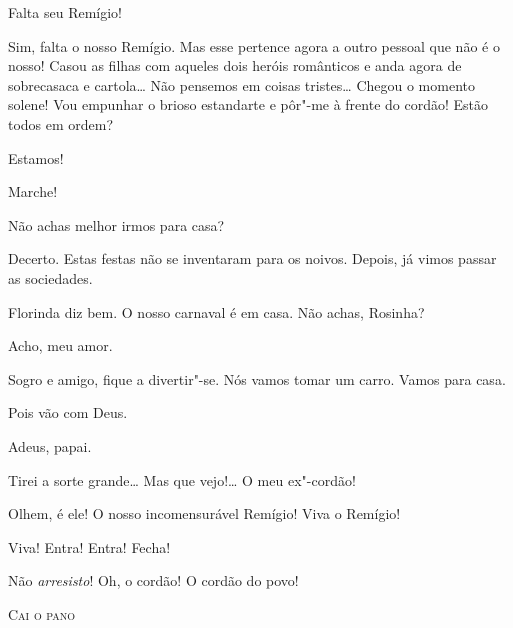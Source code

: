  Falta seu Remígio!

 Sim, falta o nosso Remígio. Mas esse pertence agora a
outro pessoal que não é o nosso! Casou as filhas com aqueles dois heróis
românticos e anda agora de sobrecasaca e cartola\ldots{} Não pensemos em coisas
tristes\ldots{}  Chegou o momento solene! Vou
empunhar o brioso estandarte e 
pôr"-me à frente do cordão! Estão todos em ordem?

 Estamos!

 Marche!  










  Não achas melhor irmos para casa?

 Decerto. Estas festas não se inventaram para os noivos.
Depois, já vimos passar as sociedades.

 Florinda diz bem. O nosso carnaval é em casa. Não achas,
Rosinha?

 Acho, meu amor.

 Sogro e amigo, fique a divertir"-se. Nós vamos tomar um carro.
Vamos para casa.

 Pois vão com Deus.  

 Adeus, papai.




 Tirei a sorte grande\ldots{} Mas que vejo!\ldots{} O meu ex"-cordão!

 Olhem, é ele! O nosso incomensurável Remígio! Viva o
Remígio! 

 Viva! Entra! Entra! Fecha!  

 Não \textit{arresisto}! Oh, o cordão! O cordão do povo!



\bigskip

\begin{center}
\textsc{Cai o pano}
\end{center}


